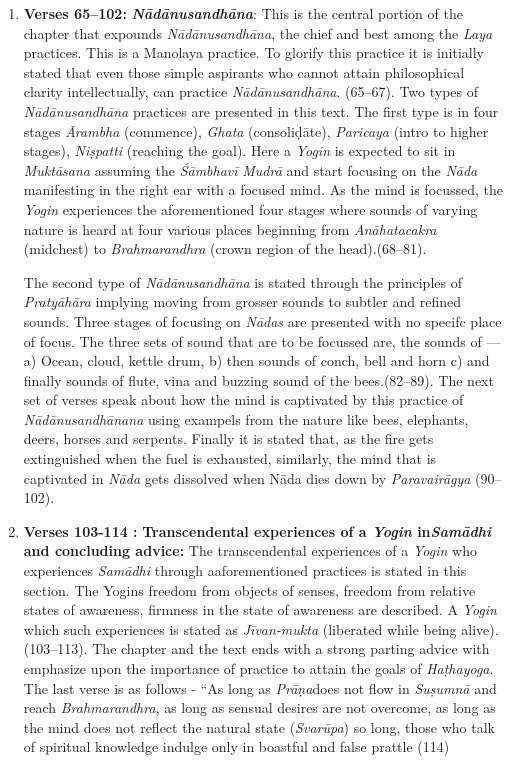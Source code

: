 \begin{enumerate}
\item \textbf{Verses 65--102:} \textit{\textbf{Nādānusandhāna}}: This is the central portion of the chapter that expounds \textit{Nādānusandhāna}, the chief and best among the \textit{Laya} practices. This is a Manolaya practice. To glorify this practice it is initially stated that even those simple aspirants who cannot attain philosophical clarity intellectually, can practice \textit{Nādānusandhāna}. (65--67). Two types of \textit{Nādānusandhāna} practices are presented in this text. The first type is in four stages \textit{Ārambha} (commence), \textit{Ghata} (consoliḍāte), \textit{Paricaya} (intro to higher stages), \textit{Niṣpatti} (reaching the goal). Here a \textit{Yogin} is expected to sit in \textit{Muktāsana} assuming the \textit{Śāmbhavī} \textit{Mudrā} and start focusing on the \textit{Nāda} manifesting in the right ear with a focused mind.  As the mind is focussed, the \textit{Yogin} experiences the aforementioned four stages where sounds of varying nature is heard at four various places beginning from \textit{Anāhatacakra} (midchest) to \textit{Brahmarandhra} (crown region of the head).(68--81).

The second type of \textit{Nādānusandhāna} is stated through the principles of \textit{Pratyāhāra} implying moving from grosser sounds to subtler and refined sounds. Three stages of focusing on \textit{Nādas} are presented with  no specifc place of focus. The three sets of sound that are to be focussed are, the sounds of --- a) Ocean, cloud, kettle drum, b) then sounds of conch, bell and horn c) and finally sounds of flute, vina and buzzing sound of the bees.(82--89). The next set of verses speak about how the mind is captivated by this practice of \textit{Nādānusandhānana} using exampels from the nature like bees, elephants, deers, horses and serpents. Finally it is stated that, as the fire gets extinguished when the fuel is exhausted, similarly, the mind that is captivated in \textit{Nāda} gets dissolved when Nāda dies down by \textit{Paravairāgya} (90--102).
 
\item \textbf{Verses 103-114 :} \textbf{Transcendental experiences of a \textit{Yogin} in\break \textit{Samādhi} and concluding advice:} The transcendental experiences of a \textit{Yogin} who experiences \textit{Samādhi} through aaforementioned practices is stated in this section. The Yogins freedom from objects of senses, freedom from relative states of awareness, firmness in the state of awareness are described. A \textit{Yogin} which such experiences is stated as \textit{Jīvan-mukta} (liberated while being alive). (103--113). The chapter and the text ends with a strong parting advice with emphasize upon the importance of practice to attain the goals of \textit{Haṭhayoga}. The last verse is as follows - “As long as \textit{Prāṇa}does not flow in \textit{Suṣumnā} and reach \textit{Brahmarandhra}, as long as sensual desires are not overcome, as long as the mind does not reflect the natural state (\textit{Svarūpa}) so long, those who talk of spiritual knowledge indulge only in boastful and false prattle (114)   
\end{enumerate}
